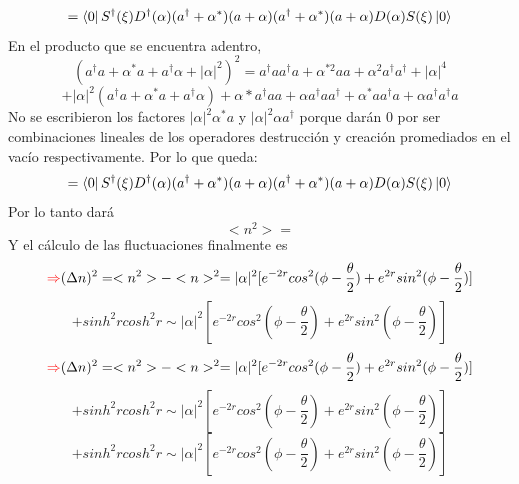 \documentclass{book}
\begin{document}
   \begin{equation}{=\bra{0}S^\dag(\xi)D^\dag(\alpha)(a^\dag+\alpha^*)(a+\alpha)(a^\dag+\alpha^*)(a+\alpha)D(\alpha)S(\xi) \ket{0}} \end{equation}
    En el producto que se encuentra adentro,
    \begin{equation}{(a^\dag a +\alpha^* a +a^\dag \alpha+\lvert\alpha\rvert^2)^2=a^\dag aa^\dag a+\alpha^{*2}aa+\alpha^2 a^\dag a^\dag+\lvert\alpha\rvert^4} \end{equation} \begin{equation}{+\lvert\alpha\rvert^2(a^\dag a +\alpha^* a +a^\dag \alpha)+\alpha *a^\dag a a+\alpha a^\dag a a^\dag+\alpha^* a a^\dag a+\alpha a^\dag a^\dag a} \end{equation} No se escribieron los factores ${\lvert\alpha\rvert^2\alpha^*a}$ y ${\lvert\alpha\rvert^2\alpha a^\dag}$ porque darán 0 por ser combinaciones lineales de los operadores destrucción y creación promediados en el vacío respectivamente. Por lo que queda:
      \begin{equation}{=\bra{0}S^\dag(\xi)D^\dag(\alpha)(a^\dag+\alpha^*)(a+\alpha)(a^\dag+\alpha^*)(a+\alpha)D(\alpha)S(\xi) \ket{0}} \end{equation}
   Por lo tanto dará
   \begin{equation}{ <n^2>=} \end{equation}
   Y el cálculo de las fluctuaciones finalmente es
   \begin{equation}{\textcolor{red}{\Rightarrow} (\Delta n)^2=<n^2>-<n>^2=\lvert\alpha\rvert^2[e^{-2r}cos^2(\phi-\frac{\theta}{2})+e^{2r}sin^2(\phi-\frac{\theta}{2})]} \end{equation} \begin{equation}{+sinh^2 r cosh^2 r\sim \lvert\alpha\rvert^2[e^{-2r}cos^2(\phi-\frac{\theta}{2})+e^{2r}sin^2(\phi-\frac{\theta}{2})]} \end{equation}
\begin{equation}\textcolor{red}{\Rightarrow} (\Delta n)^2=<n^2>-<n>^2=\lvert\alpha\rvert^2[e^{-2r}cos^2(\phi-\frac{\theta}{2})+e^{2r}sin^2(\phi-\frac{\theta}{2})]\end{equation} \begin{equation}{+sinh^2 r cosh^2 r\sim \lvert\alpha\rvert^2[e^{-2r}cos^2(\phi-\frac{\theta}{2})+e^{2r}sin^2(\phi-\frac{\theta}{2})]} \end{equation}
 \begin{equation}{+sinh^2 r cosh^2 r\sim \lvert\alpha\rvert^2[e^{-2r}cos^2(\phi-\frac{\theta}{2})+e^{2r}sin^2(\phi-\frac{\theta}{2})]} \end{equation}
\end{document}
